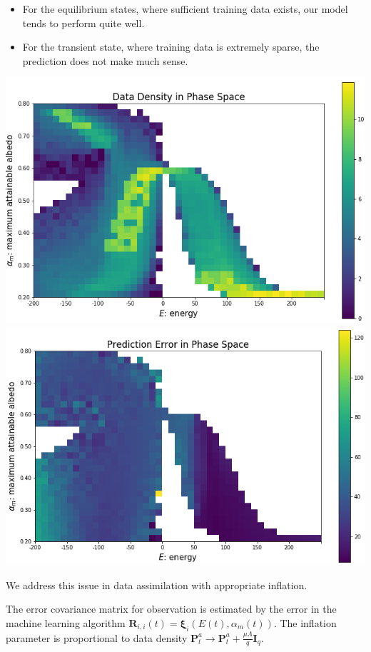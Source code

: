 \documentclass[landscape,a0paper,fontscale=0.3]{baposter} %
\newcommand{\compresslist}{ %
\setlength{\itemsep}{1pt}
\setlength{\parskip}{0pt}
\setlength{\parsep}{0pt}
}
\newcommand{\mR}{\textbf{R}}
\newcommand{\mP}{\textbf{P}}
\newcommand{\mI}{\textbf{I}}
\newcommand{\mxi}{\bm{\xi}}
\newcommand{\am}{\alpha_m}
\begin{document}
\begin{poster}
{\begin{itemize}\compresslist
	\item For the equilibrium states, where sufficient training data exists, our model tends to perform quite well.
	\item For the transient state, where training data is extremely sparse, the prediction does not make much sense.
\end{itemize}
\begin{multicols}{2}
\centering
\includegraphics[width=.7\linewidth]{DensityMatrix.png}
\centering
\includegraphics[width=.7\linewidth]{ErrorMatrix.png}
\end{multicols}

We address this issue in data assimilation with appropriate inflation.
\begin{multicols}{2}
The error covariance matrix for observation is estimated by the error in the machine learning algorithm $\mR_{i,i}(t) = \mxi_i(E(t),\am(t))$.
\vfill\null
\columnbreak
The inflation parameter is proportional to data density $\mP_t^a\rightarrow \mP_t^a+\frac{\mu\Lambda}{q}\mI_q$.
\end{multicols}

}



\end{poster}
\end{document}
